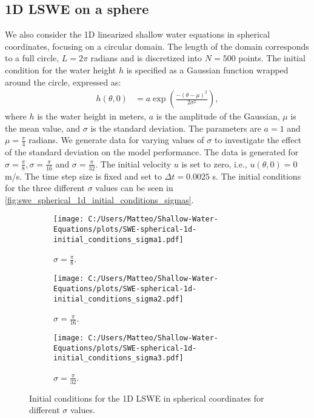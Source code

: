 \subsection*{1D LSWE on a sphere}
We also consider the 1D linearized shallow water equations in spherical coordinates, focusing on a circular domain.
The length of the domain corresponds to a full circle, $L = 2 \pi$ radians and is discretized into $N = 500$ points.
The initial condition for the water height $h$ is specified as a Gaussian function wrapped around the circle, expressed as:
\begin{align}\label{eq:1D_swe_spherical_ic}
    h(\theta, 0) &= a \exp \left( \frac{-{(\theta-\mu)}^2}{2 \sigma^2} \right),
\end{align}
where $h$ is the water height in meters, $a$ is the amplitude of the Gaussian, $\mu$ is the mean value, and $\sigma$ is the standard deviation.
The parameters are $a = 1$  and $\mu = \frac{\pi}{4}$ radians.
We generate data for varying values of $\sigma$ to investigate the effect of the standard deviation on the model performance.
The data is generated for $\sigma = \frac{\pi}{8}, \sigma = \frac{\pi}{16}$ and $\sigma = \frac{\pi}{32}$.
The initial velocity $u$ is set to zero, i.e., $u(\theta,0) = 0$ m/s.
The time step size is fixed and set to $\Delta t = 0.0025$ s.
The initial conditions for the three different $\sigma$ values can be seen in \autoref{fig:swe_spherical_1d_initial_conditions_sigmas}.
\begin{figure}[H]
    \centering
    \begin{subfigure}[b]{0.3\textwidth}
        \centering
        \texttt{[image: C:/Users/Matteo/Shallow-Water-Equations/plots/SWE-spherical-1d-initial\_conditions\_sigma1.pdf]}
        \caption{$\sigma = \frac{\pi}{8}$.}\label{fig:swe_spherical_1d_sigma1}
    \end{subfigure}
    \hfill
    \begin{subfigure}[b]{0.3\textwidth}
        \centering
        \texttt{[image: C:/Users/Matteo/Shallow-Water-Equations/plots/SWE-spherical-1d-initial\_conditions\_sigma2.pdf]}
        \caption{$\sigma = \frac{\pi}{16}$.}\label{fig:swe_spherical_1d_sigma2}
    \end{subfigure}
    \hfill
    \begin{subfigure}[b]{0.3\textwidth}
        \centering
        \texttt{[image: C:/Users/Matteo/Shallow-Water-Equations/plots/SWE-spherical-1d-initial\_conditions\_sigma3.pdf]}
        \caption{$\sigma = \frac{\pi}{32}$.}\label{fig:swe_spherical_1d_sigma3}
    \end{subfigure}
    \caption{Initial conditions for the 1D LSWE in spherical coordinates for different \(\sigma\) values.}\label{fig:swe_spherical_1d_initial_conditions_sigmas}
\end{figure}
